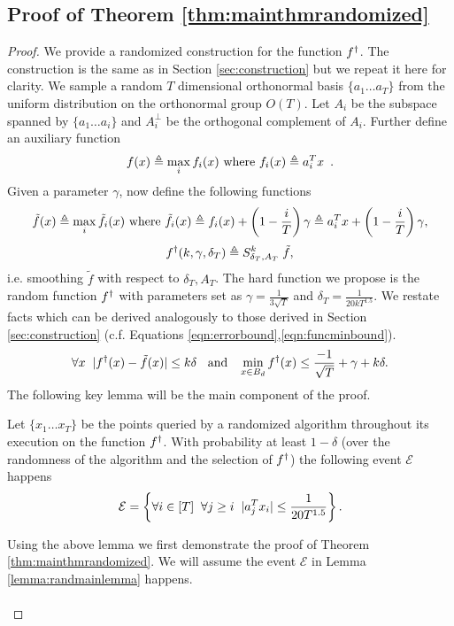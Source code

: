 \subsection{Proof of Theorem \ref{thm:mainthmrandomized}}

\begin{proof}
  We provide a randomized construction for the function $f^{\dagger}$.
  The construction is the same as in Section \ref{sec:construction} but we repeat it here for clarity. 
  We sample a random $T$ dimensional orthonormal basis $\{a_1 \ldots a_T\}$ from the uniform distribution on the orthonormal group $O(T)$. Let $A_i$ be the subspace spanned by $\{a_1 \ldots a_i\}$ and $A_i^{\perp}$ be the orthogonal complement of $A_i$. Further define an auxiliary function 
\[f(x) \triangleq \max_i f_i(x) \text{ where } f_i(x) \triangleq a_i^T x\enspace.\]
Given a parameter $\gamma$, now define the following functions 
\[ \tilde{f}(x) \triangleq \max_i \tilde{f}_i(x) \text{ where } \tilde{f}_i(x) \triangleq f_i(x) + \left(1 - \frac{i}{T} \right)\gamma \triangleq a_i^T x + \left(1 - \frac{i}{T} \right)\gamma,\] 
\begin{equation}
  \label{eqn:hardfdef}
  f^{\dagger}(k, \gamma, \delta_T) \triangleq S^k_{\delta_T, A_T} \;\tilde{f},
\end{equation}
i.e. smoothing $\tilde{f}$ with respect to $\delta_T, A_T$. The hard function we propose is the random function $f^{\dagger}$ with parameters set as $\gamma = \frac{1}{3\sqrt{T}}$ and $\delta_T = \frac{1}{20kT^{1.5}}$. 
  We restate facts which can be derived analogously to those derived in Section \ref{sec:construction} (c.f. Equations \eqref{eqn:errorbound},\eqref{eqn:funcminbound}).
  \begin{equation}
  \label{eqn:errorboundrand}
  \forall x \;\;|f^{\dagger}(x) - \tilde{f}(x)| \leq k\delta \;\;\text{ and }\;\; \min_{x \in B_d} f^{\dagger}(x) \leq \frac{-1}{\sqrt{T}} + \gamma + k\delta.
  \end{equation}
The following key lemma will be the main component of the proof. 
\begin{lemma}
\label{lemma:randmainlemma}
  Let $\{x_1 \ldots x_T\}$ be the points queried by a randomized algorithm throughout its execution on the function $f^{\dagger}$. With probability at least $1 - \delta$ (over the randomness of the algorithm and the selection of $f^{\dagger}$) the following event $\mathcal{E}$ happens
  \[ \mathcal{E} = \left\{ \forall i \in [T] \;\; \forall j \geq i\;\;|a_j^Tx_i| \leq \frac{1}{20T^{1.5}} \right\}.\]  
\end{lemma}
Using the above lemma we first demonstrate the proof of Theorem \ref{thm:mainthmrandomized}. We will assume the event $\mathcal{E}$ in Lemma \ref{lemma:randmainlemma} happens.
\\
\\


\end{proof}
